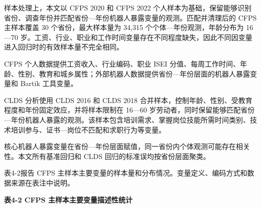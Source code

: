 \documentclass[UTF8, zihao=-4, a4paper, openany, fontset=none]{ctexrep}
\numberwithin{equation}{chapter}
\begin{document}
样本处理上，本文以 CFPS 2020 和 CFPS 2022 个人样本为基础，保留能够识别省份、调查年份并匹配省份---年份机器人暴露变量的观测。匹配并清理后的 CFPS 主样本覆盖 30 个省份，最大样本量为 34,315 个个体---年份观测，年龄分布为 16---70 岁。工资、行业、职业和工作时间变量存在不同程度缺失，因此不同因变量进入回归时的有效样本量不完全相同。

CFPS 个人数据提供工资收入、行业编码、职业 ISEI 分值、每周工作时间、年龄、性别、教育和城乡属性；外部机器人数据提供省份---年份层面的机器人暴露变量和 Bartik 工具变量。

CLDS 分析使用 CLDS 2016 和 CLDS 2018 合并样本，控制年龄、性别、受教育程度和年份固定效应，并将样本限制在 16---60 岁劳动者，同时保留能够匹配省份---年份机器人暴露的观测。该样本包含培训需求、掌握岗位技能所需时间类别、技术培训参与、证书---岗位不匹配和求职行为等变量。

核心机器人暴露变量在省份---年份层面赋值，同一省份内个体观测可能存在相关性。本文所有基准回归和 CLDS 回归的标准误均按省份层面聚类。

表4-2报告 CFPS 主样本主要变量的样本量和分布情况。变量定义、编码方式和数据来源在表注中说明。

\textbf{表4-2 CFPS 主样本主要变量描述性统计}
\end{document}
